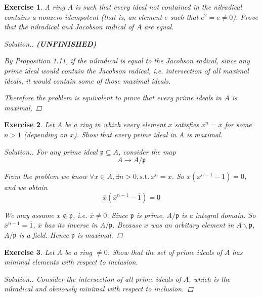 \documentclass{article}
\theoremstyle{breakstyle}
\newtheorem{exercise}{Exercise}
\newenvironment{solution}
  {\begin{proof}[Solution.]\renewcommand{\qedsymbol}{}}
  {\end{proof}}
\begin{document}
\begin{exercise}
A ring \(A\) is such that every ideal not contained in the nilradical contains a nonzero idempotent (that is, an element \(e\) such that \(e^2=e\neq0\)). Prove that the nilradical and Jacobson radical of \(A\) are equal.

\begin{solution}
    \textbf{(UNFINISHED)}

        By \emph{Proposition 1.11}, if the nilradical is equal to the Jacobson radical,
        since any prime ideal would contain the Jacobson radical, i.e. intersection of all maximal ideals,
        it would contain some of those maximal ideals.

        Therefore the problem is equivalent to prove that every prime ideals in $A$ is maximal,

\end{solution}
\end{exercise}

\begin{exercise}
Let \(A\) be a ring in which every element \(x\) satisfies \(x^n=x\) for some \(n>1\) (depending on \(x\)). Show that every prime ideal in \(A\) is maximal.

\begin{solution}
    For any prime ideal $\mathfrak{p}\subseteq A$, consider the map
        $$
        A\longrightarrow A / \mathfrak{p}
        $$

        From the problem we know $\forall x\in A,\exists n>0,\mathrm{s.t.}\ x^{n}=x$.
        So $x(x^{n-1}-1)=0$, and we obtain
        $$
        \overline{x}(\overline{x}^{n-1}-\overline{1})=0
        $$

        We may assume $x\not\in \mathfrak{p}$, i.e. $\overline{x}\neq 0$.
        Since $\mathfrak{p}$ is prime, $A / \mathfrak{p}$ is a integral domain.
        So $\overline{x}^{n-1}=\overline{1}$, $\overline{x}$ has its inverse in $A / \mathfrak{p}$.
        Because $x$ was an arbitary element in $A \backslash \mathfrak{p}$, $A / \mathfrak{p}$ is a field.
        Hence $\mathfrak{p}$ is maximal.
\end{solution}
\end{exercise}

\begin{exercise}
Let \(A\) be a ring \(\neq0\). Show that the set of prime ideals of \(A\) has minimal elements with respect to inclusion.

\begin{solution}
    Consider the intersection of all prime ideals of $A$, which is the nilradical and obviously minimal with respect to inclusion.
\end{solution}
\end{exercise}
\end{document}
